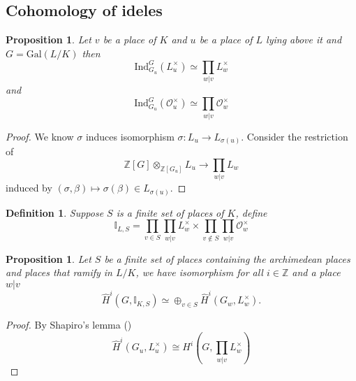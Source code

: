 \documentclass[twoside, 12pt]{iiser-thesis}
\newtheorem{prop}[thm]{ Proposition}
\newtheorem{defi}{ Definition}[section]
\newcommand{\Z}{\mathbb{Z}}
\newcommand{\I}{\mathbb{I}}
\newcommand{\Ol}{\mathcal{O}}
\newcommand{\gal}{\text{Gal}}
\newcommand{\x}{\times}
\begin{document}
\subsection{Cohomology of ideles}
\begin{prop}
Let $v$ be a place of $K$ and $u$ be a place of $L$ lying above it and $G=\gal(L/K)$ then \[\text{Ind}_{G_u}^G(L_u ^\x) \simeq \prod _{w|v} L^\x _w \] and \[ \text{Ind} _{G_u}^G(\Ol _u ^\x ) \simeq \prod _{w|v} \Ol _w ^\x \]
\end{prop}
\begin{proof}
We know $\sigma $ induces isomorphism $\sigma : L_u \rightarrow L_{\sigma (u)}$. Consider the restriction of \[ \Z [G] \otimes _{\Z[G_u]}L_u \rightarrow \prod _{w|v}L_w\]
induced by $(\sigma , \beta ) \mapsto \sigma (\beta )\in L_{\sigma (u)} .$
\end{proof}
\begin{defi}
Suppose $S$ is a finite set of places of $K$, define \[ \I _{L,S} = \prod _{v\in S} \prod _{w|v} L^\x _w \times \prod _{v\not \in S } \prod _{w|v} \Ol ^\x _w \]
\end{defi}

\begin{prop}
Let $S$ be a finite set of places containing the archimedean places and places that ramify in $L/K$, we have isomorphism for all $i \in \Z$ and a place $w|v$ 
\[ \hat H^i (G, \I _{K,S} ) \simeq \oplus _{v\in S} \hat H^i (G_w,L_w ^\x ) .\]
\end{prop}
\begin{proof}
By Shapiro's lemma () \[ \hat H^i(G_u, L_u ^\x) \cong H^i(G, \prod _{w|v} L_w ^\x) \]
\end{proof}




\end{document}
